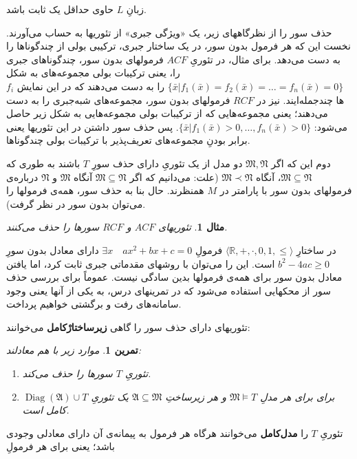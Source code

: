 \documentclass[12pt,a4paper]{report}
\theoremstyle{colorhead}
\newtheorem{tam}{تمرین}
\newtheorem{mesal}[thm]{مثال}
\DeclareMathOperator{\diag}{Diag}
\begin{document}
زبانِ
$L$
حاوی 
حداقل یک ثابت باشد.
\par 
حذف سور را از نظرگاههای زیر،
 یک «ویژگی جبری» از تئوریها به حساب می‌آورند.  نخست این که هر فرمول بدون سور، در یک ساختار جبری، ترکیبی بولی 
 از چندگوناها 
 را به دست می‌دهد. برای مثال، در تئوریِ
  $ACF$
  فرمولهای 
  بدون سور، چندگوناهای جبری را، یعنی ترکیبات بولی مجموعه‌های به شکل
  $\{\bar{x}|f_1(\bar{x})=f_2(\bar{x})=\ldots=f_n(\bar{x})=0\}$
   را به دست می‌دهند که در این نمایش
  $f_i$
  ها چندجمله‌ایند. 
  نیز در
  $RCF$
  فرمولهای بدون سور، 
  مجموعه‌های شبه‌جبری   
  را به دست می‌دهند؛ یعنی مجموعه‌هایی که از ترکیبات بولی مجموعه‌هایی به شکل زیر حاصل می‌شود:
  $\{\bar{x}|f_1(\bar{x})>0, \ldots, f_n(\bar{x})>0\}$.
  پس 
  حذف سور داشتن در این تئوریها یعنی برابر بودنِ مجموعه‌های تعریف‌پذیر با 
  ترکیبات بولی چندگوناها. 
  \par 
 دوم این که اگر
  $\mathfrak{M},\mathfrak{N}$
  دو
  مدل از یک تئوریِ دارای حذف سورِ
  $T$
  باشند به طوری که
  $\mathfrak{M}\subseteq \mathfrak{N}$،
  آنگاه
  $\mathfrak{M}\prec \mathfrak{N}$
  (علت: می‌دانیم که اگر
  $\mathfrak{M}\subseteq \mathfrak{N}$
  آنگاه 
  $\mathfrak{M}$
  و
  $\mathfrak{N}$
  درباره‌ی 
  فرمولهای بدون سور با پارامتر در
  $M$
  همنظرند. حال
  بنا به حذف سور، همه‌ی فرمولها را می‌توان بدون سور در نظر گرفت).
  \begin{mesal}
  تئوریهای
  $ACF$
  و
  $RCF$
  سورها را حذف می‌کنند.
  \end{mesal}
در ساختارِ
$\langle \mathbb{R},+,\cdot,0,1,\leq\rangle$
 فرمولِ
 $\exists x\quad ax^2+bx+c=0$
 دارای معادل بدون سورِ
 $b^2-4ac\geq 0$
 است. این را می‌توان با روشهای مقدماتی جبری ثابت کرد، اما یافتن معادل بدون سور برای همه‌ی فرمولها بدین سادگی نیست. عموماً برای بررسی حذف سور از محکهایی استفاده می‌شود که در تمرینهای درس، به یکی از آنها یعنی وجود سامانه‌های رفت و برگشتی خواهیم پرداخت. 
 \par 
 تئوریهای دارای حذف سور را گاهی 
\textbf{زیرساختارْکامل}
 می‌خوانند:
 \begin{tam}
موارد زیر با هم معادلند:
 \begin{enumerate}
 \item 
  تئوریِ
  $T$
  سورها را حذف می‌کند.
 \item 
 $\diag(\mathfrak{A})\cup T$
 برای 
 برای هر مدلِ
 $\mathfrak{M}\models T$
 و هر زیرساختِ
  $\mathfrak{A}\subseteq \mathfrak{M}$
  یک تئوریِ
  کامل است. 	
 \end{enumerate}
 \end{tam}
تئوریِ
$T$
را 
\textbf{مدل‌کامل}
 می‌خوانند هرگاه هر فرمول به پیمانه‌ی آن دارای معادلی وجودی باشد؛ یعنی برای هر فرمولِ
\end{document}
